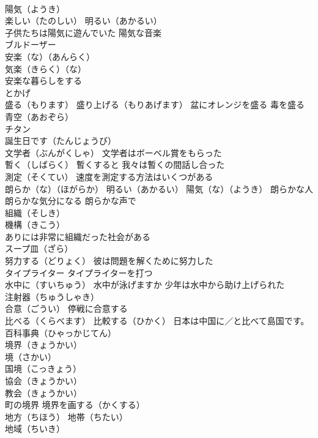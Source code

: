 \documentclass[8pt]{extreport}
\begin{document}
\begin{CJK}{UTF8}{min}
\\	陽気（ようき） 
\\	楽しい（たのしい） 明るい（あかるい）
\\	子供たちは陽気に遊んでいた 陽気な音楽
\\	ブルドーザー
\\	安楽（な）（あんらく）
\\	気楽（きらく）（な）
\\	安楽な暮らしをする
\\	とかげ
\\	盛る（もります） 盛り上げる（もりあげます） 盆にオレンジを盛る 毒を盛る
\\	青空（あおぞら）
\\	チタン
\\	誕生日です（たんじょうび）
\\	文学者（ぶんがくしゃ） 文学者はボーベル賞をもらった
\\	暫く（しばらく） 暫くすると 我々は暫くの間話し合った
\\	測定（そくてい） 速度を測定する方法はいくつがある
\\	朗らか（な）（ほがらか） 明るい（あかるい） 陽気（な）（ようき） 朗らかな人 朗らかな気分になる 朗らかな声で
\\	組織（そしき） 
\\	機構（きこう）
\\	ありには非常に組織だった社会がある
\\	スープ皿（ざら）
\\	努力する（どりょく） 彼は問題を解くために努力した
\\	タイプライター タイプライターを打つ
\\	水中に（すいちゅう） 水中が泳げますか 少年は水中から助け上げられた
\\	注射器（ちゅうしゃき）
\\	合意（ごうい） 停戦に合意する
\\	比べる（くらべます） 比較する（ひかく） 日本は中国に／と比べて島国です。
\\	百科事典（ひゃっかじてん）
\\	境界（きょうかい）
\\	境（さかい）
\\	国境（こっきょう）
\\	協会（きょうかい） 
\\	教会（きょうかい）
\\	町の境界 境界を画する（かくする）
\\	地方（ちほう） 地帯（ちたい）
\\	地域（ちいき）

\end{CJK}
\end{document}

